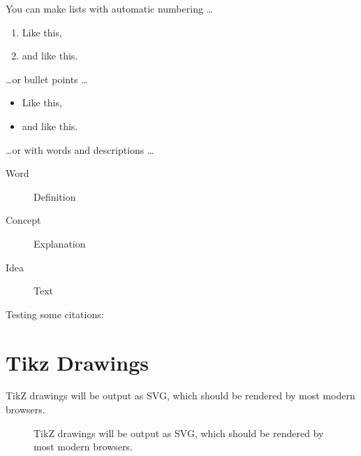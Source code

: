 \documentclass[a4paper,11pt]{article}
\begin{document}
You can make lists with automatic numbering \dots

\begin{enumerate}
\item Like this,
\item and like this.
\end{enumerate}
\dots or bullet points \dots
\begin{itemize}
\item Like this,
\item and like this.
\end{itemize}
\dots or with words and descriptions \dots
\begin{description}
\item[Word] Definition
\item[Concept] Explanation
\item[Idea] Text
\end{description}

Testing some citations: \cite{NTLKProject2015,Bond2014}

\section{Tikz Drawings}

TikZ drawings will be output as SVG, which should be rendered by most modern browsers.

\begin{figure}
\centering
{}
\caption{TikZ drawings will be output as SVG, which should be rendered by most modern browsers.}
\end{figure}



\end{document}
